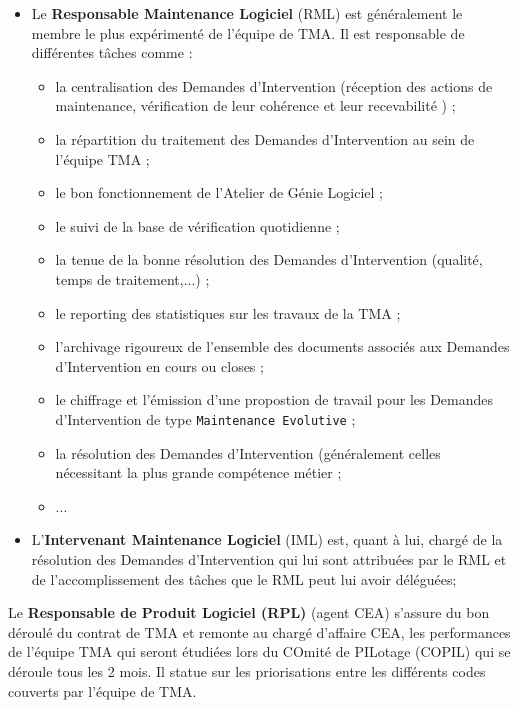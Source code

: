 \begin{itemize}[label=$\Rightarrow$, font=\LARGE]
  \item Le \textbf{Responsable Maintenance Logiciel} (RML) est g\'en\'eralement le membre le plus exp\'eriment\'e de l'\'equipe de TMA. Il est responsable de diff\'erentes t\^aches comme :
  \begin{itemize}
    \item la centralisation des Demandes d'Intervention (r\'eception des actions de maintenance,  v\'erification de leur coh\'erence et leur recevabilit\'e ) ;
    \item la r\'epartition du traitement des Demandes d'Intervention au sein de l'\'equipe TMA ;
    \item le bon fonctionnement de l'Atelier de G\'enie Logiciel ;
    \item le suivi de la base de v\'erification quotidienne ;
    \item la tenue de la bonne r\'esolution des Demandes d'Intervention (qualit\'e, temps de traitement,...) ;
    \item le reporting des statistiques sur les travaux de la TMA ;
    \item l'archivage rigoureux de l'ensemble des documents associ\'es aux Demandes d'Intervention en cours ou closes ;
    \item le chiffrage et l'\'emission d'une propostion de travail pour les Demandes d'Intervention de type \texttt{Maintenance Evolutive} ;
    \item la r\'esolution des Demandes d'Intervention (g\'en\'eralement celles n\'ecessitant la plus grande comp\'etence
    m\'etier ;
    \item ...
  \end{itemize}
  \item L'\textbf{Intervenant Maintenance Logiciel} (IML) est, quant \`a lui, charg\'e de la r\'esolution des Demandes d'Intervention qui lui sont attribu\'ees par le RML et de l'accomplissement des t\^aches que le RML peut lui avoir d\'el\'egu\'ees;
\end{itemize}\smallskip

Le \textbf{Responsable de Produit Logiciel (RPL)} (agent CEA) s'assure du bon déroulé du contrat de TMA et remonte au chargé d'affaire CEA, les performances de l'équipe TMA qui seront étudiées lors du COmité de PILotage (COPIL) qui se déroule tous les 2 mois. Il statue sur les priorisations entre les différents codes couverts par l'équipe de TMA.\smallskip\newline

